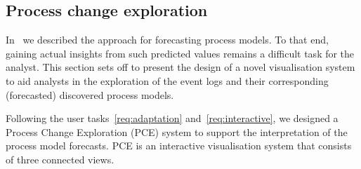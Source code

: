 \subsection{Process change exploration}\label{sec:3c:pce}




In~ we described the approach for forecasting process models. To that end, gaining actual insights from such predicted values remains a difficult task for the analyst. This section sets off to present the design of a novel visualisation system to aid analysts in the exploration of the event logs and their corresponding (forecasted) discovered process models.

Following the user tasks~\ref{req:adaptation} and~\ref{req:interactive}, we designed a Process Change Exploration (PCE) system to support the interpretation of the process model forecasts. PCE is an interactive visualisation system that consists of three connected views.




%
%




